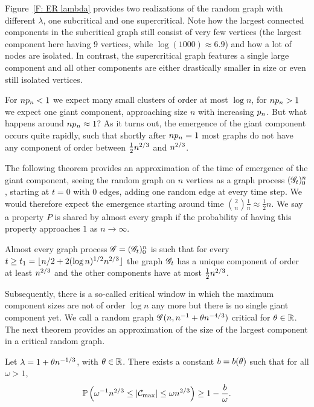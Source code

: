 Figure~\ref{F: ER lambda} provides two realizations of the random graph with different $\lambda$,
one sub\-critical and one supercritical.
Note how the largest connected components in the sub\-critical graph still con\-sist of very few vertices
(the largest component here having 9 vertices, while $\log(1000) \approx 6.9$)
and how a lot of nodes are isolated.
In contrast, the supercritical graph features a single large component 
and all other components are either drastically smaller in size or even still isolated vertices.

\bigskip

For $n p_n < 1$ we expect many small clusters of order at most $\log n$,
for $n p_n > 1$ we expect one giant component, approaching size $n$ with increasing $p_n$.
But what happens around $n p_n \approx 1$?
As it turns out, the emergence of the giant component occurs quite rapidly,
such that shortly after $n p_n = 1$ most graphs do not have any component of order between $\frac{1}{2}n^{2 / 3}$ and $n^{2 / 3}$.

The following theorem provides an approximation of the time of emergence of the giant component,
seeing the random graph on $n$ vertices as a graph process $(\mathscr{G}_t)_0^n$,
starting at $t=0$ with $0$ edges, adding one random edge at every time step.
We would therefore expect the emergence starting around time $\binom{2}{n}\frac{1}{n} \approx \frac{1}{2}n$.
We say a property $P$ is shared by almost every graph if the probability of having this property approaches $1$ as $n \rightarrow \infty$. \label{I: point conv}

\begin{theorem}
	Almost every graph process
	$\mathscr{G} = (\mathscr{G}_t)_0^n$ is such that 
	for every $t \geq t_1 = \lfloor n/2 + 2(\log n)^{1/2}n^{2 / 3} \rfloor$ 
	the graph $\mathscr{G}_t$ has a unique component of order at least $n^{2 / 3}$ and the other components have at most $\frac{1}{2}n^{2 / 3}$.
\end{theorem}

Subsequently, there is a so-called critical window in which the maximum component sizes are not of order $\log n$ any more 
but there is no single giant component yet.
We call a random graph $\mathscr{G}(n, n^{-1} + \theta n^{-4 / 3})$ critical for $\theta \in \mathbb{R}$.\label{I: pp}
The next theorem provides an approximation of the size of the largest component in a critical random graph.

\begin{theorem} \label{T: largest critical cluster}
	Let $\lambda = 1 + \theta n^{-1 / 3}$, with $\theta \in \mathbb{R}$.
	There exists a constant $b = b(\theta)$ such that for all $\omega > 1$,
	\begin{equation}
		\mathbb{P}\left( \omega^{-1} n^{2 / 3} \leq |\mathcal{C}_{\max}| \leq \omega n^{2 / 3}\right) \geq 1 - \frac{b}{\omega}.
	\end{equation}	
\end{theorem}

